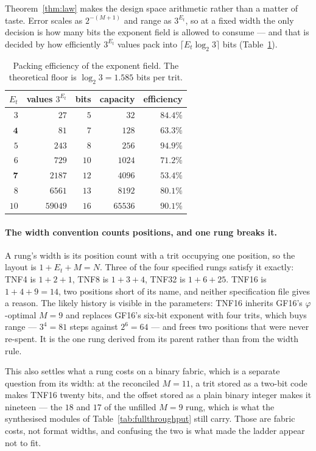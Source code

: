 \documentclass[11pt]{article}
\theoremstyle{definition}
\begin{document}
Theorem~\ref{thm:law} makes the design space arithmetic rather than a matter of
taste. Error scales as $2^{-(M+1)}$ and range as $3^{E_t}$, so at a fixed width
the only decision is how many bits the exponent field is allowed to consume ---
and that is decided by how efficiently $3^{E_t}$ values pack into
$\lceil E_t \log_2 3\rceil$ bits (Table~\ref{tab:pack}).

\begin{table}[t]\centering
\caption{Packing efficiency of the exponent field. The theoretical floor is
$\log_2 3 = 1.585$ bits per trit.}
\label{tab:pack}
\begin{tabular}{rrrrr}
\toprule
$E_t$ & values $3^{E_t}$ & bits & capacity & efficiency \\
\midrule
$3$  & $27$    & $5$  & $32$   & $84.4\%$ \\
$\mathbf{4}$  & $81$    & $7$  & $128$  & $\mathbf{63.3\%}$ \\
$5$  & $243$   & $8$  & $256$  & $\mathbf{94.9\%}$ \\
$6$  & $729$   & $10$ & $1024$ & $71.2\%$ \\
$\mathbf{7}$  & $2187$  & $12$ & $4096$ & $\mathbf{53.4\%}$ \\
$8$  & $6561$  & $13$ & $8192$ & $80.1\%$ \\
$10$ & $59049$ & $16$ & $65536$ & $90.1\%$ \\
\bottomrule
\end{tabular}
\end{table}

\paragraph{The width convention counts positions, and one rung breaks it.}
A rung's width is its position count with a trit occupying one position, so the
layout is $1 + E_t + M = N$. Three of the four specified rungs satisfy it exactly:
TNF4 is $1+2+1$, TNF8 is $1+3+4$, TNF32 is $1+6+25$. TNF16 is
$1+4+9 = 14$, two positions short of its name, and neither specification file
gives a reason. The likely history is visible in the parameters: TNF16 inherits
GF16's $\varphi$-optimal $M = 9$ and replaces GF16's six-bit exponent with four
trits, which buys range --- $3^4 = 81$ steps against $2^6 = 64$ --- and frees two
positions that were never re-spent. It is the one rung derived from its parent
rather than from the width rule.

This also settles what a rung costs on a binary fabric, which is a separate
question from its width: at the reconciled $M = 11$, a trit stored as a two-bit
code makes TNF16 twenty bits, and the offset stored as a plain binary integer
makes it nineteen --- the $18$ and $17$ of the unfilled $M = 9$ rung, which is
what the synthesised modules of Table~\ref{tab:fullthroughput} still carry. Those
are fabric costs, not format widths, and confusing the two is what made the
ladder appear not to fit.
\end{document}
